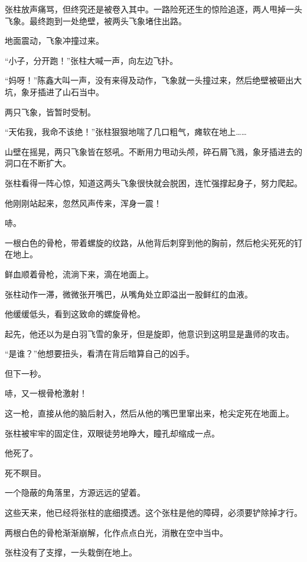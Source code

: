 
\begin{this_body}

张柱放声痛骂，但终究还是被卷入其中。一路险死还生的惊险追逐，两人甩掉一头飞象。最终跑到一处绝壁，被两头飞象堵住出路。

地面震动，飞象冲撞过来。

“小子，分开跑！”张柱大喊一声，向左边飞扑。

“妈呀！”陈鑫大叫一声，没有来得及动作，飞象就一头撞过来，然后绝壁被砸出大坑，象牙插进了山石当中。

两只飞象，皆暂时受制。

“天佑我，我命不该绝！”张柱狠狠地喘了几口粗气，瘫软在地上……

山壁在摇晃，两只飞象皆在怒吼。不断用力甩动头颅，碎石屑飞溅，象牙插进去的洞口在不断扩大。

张柱看得一阵心惊，知道这两头飞象很快就会脱困，连忙强撑起身子，努力爬起。

他刚刚站起来，忽然风声传来，浑身一震！

哧。

一根白色的骨枪，带着螺旋的纹路，从他背后刺穿到他的胸前，然后枪尖死死的钉在地上。

鲜血顺着骨枪，流淌下来，滴在地面上。

张柱动作一滞，微微张开嘴巴，从嘴角处立即溢出一股鲜红的血液。

他缓缓低头，看到这致命的螺旋骨枪。

起先，他还以为是白羽飞雪的象牙，但是旋即，他意识到这明显是蛊师的攻击。

“是谁？”他想要扭头，看清在背后暗算自己的凶手。

但下一秒。

哧，又一根骨枪激射！

这一枪，直接从他的脑后射入，然后从他的嘴巴里窜出来，枪尖定死在地面上。

张柱被牢牢的固定住，双眼徒劳地睁大，瞳孔却缩成一点。

他死了。

死不瞑目。

一个隐蔽的角落里，方源远远的望着。

这些天来，他已经将张柱的底细摸透。这个张柱是他的障碍，必须要铲除掉才行。

两根白色的骨枪渐渐崩解，化作点点白光，消散在空中当中。

张柱没有了支撑，一头栽倒在地上。


\end{this_body}
